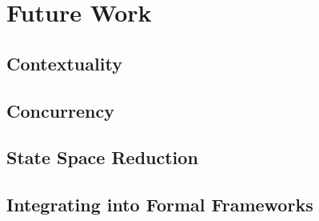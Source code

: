 \section{Future Work}

\subsection{Contextuality}

\subsection{Concurrency}

\subsection{State Space Reduction}

\subsection{Integrating  into Formal Frameworks}
